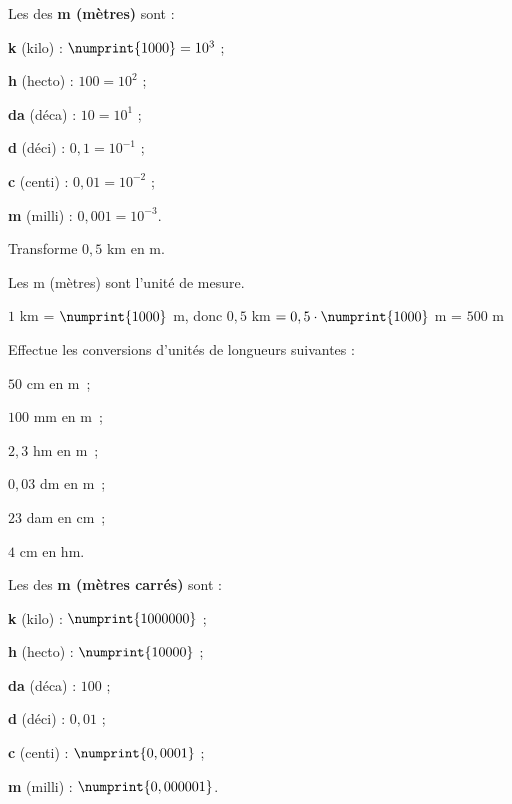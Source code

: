 
\vspace{2em}


\begin{aconnaitre}
Les  des \textbf{\textcolor{H1}{m (mètres)}} sont :
\begin{colitemize}{2}
\item \textbf{k} (kilo) : $\numprint{1000} = 10^3$ ;
\item \textbf{h} (hecto) : $100 = 10^2$ ;
\item \textbf{da} (déca) : $10 = 10^1$ ;
\item \textbf{d} (déci) : $0,1 = 10^{-1}$ ;
\item \textbf{c} (centi) : $0,01 = 10^{-2}$ ;
\item \textbf{m} (milli) : $0,001 = 10^{-3}$.
\end{colitemize}
\end{aconnaitre}

\vspace{2em}

\begin{methode*1}

\begin{exemple*1}
Transforme $0,5$ km en m.

Les m (mètres) sont l'unité de mesure.

$1$ km = $\numprint{1000}$ m, donc $0,5$ km $= 0,5 \cdot \numprint{1000}$ m = $500$ m
\end{exemple*1}

\exercice 
Effectue les conversions d'unités de longueurs suivantes :
\begin{colenumerate}{3}
 \item $50$ cm en m ;
 \item $100$ mm en m ;
 \item $2,3$ hm en m ;
 \item $0,03$ dm en m ;
 \item $23$ dam en cm ;
 \item $4$ cm en hm.
 \end{colenumerate}

\end{methode*1}

\newpage

\begin{aconnaitre}
Les  des \textbf{\textcolor{H1}{m (mètres carrés)}} sont :
\begin{colitemize}{2}
\item \textbf{k} (kilo) : $\numprint{1000000}$ ;
\item \textbf{h} (hecto) : $\numprint{10000}$ ;
\item \textbf{da} (déca) : $100$ ;
\item \textbf{d} (déci) : $0,01$ ;
\item \textbf{c} (centi) : $\numprint{0,0001}$ ;
\item \textbf{m} (milli) : $\numprint{0,000001}$.
\end{colitemize}
\end{aconnaitre}

